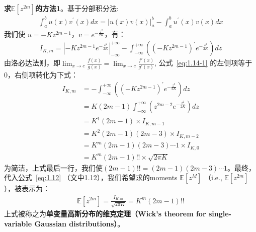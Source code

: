 \textbf{求$\mathbb{E}[z^{2m}]$的方法1}。基于分部积分法: %
\begin{equation}
    \begin{split}
 \label{eq:partial_int}
    \int_{a}^{b}{u(x)v^{'}(x)dx} =  {\left | u(x)v(x) \right |}_{a}^{b} - \int_{a}^{b}{u^{'}(x)v(x)dx} 
    \end{split}
\end{equation}
我们使 $u=-K z^{2m-1}$，$v=e^{-\frac{z^2}{2K}}$，有：
\begin{equation}
    \begin{split}
\label{eq:1.14-1}
    I_{K,m} 
        = {\left | -K z^{2m-1} e^{-\frac{z^2}{2K}} \right |}_{-\infty}^{+\infty} - \int_{-\infty}^{+\infty}\left(
            (-K z^{2m-1})^{'} e^{-\frac{z^2}{2K}}
        \right) dz 
    \end{split}
\end{equation}
由洛必达法则，即$\lim_{x\rightarrow c}\frac{f(x)}{g(x)} = \lim_{x\rightarrow c}\frac{f'(x)}{g'(x)}$, %
公式~\eqref{eq:1.14-1} 的左侧项等于 $0$，右侧项转化为下式：
\begin{equation}
    \begin{split}
        I_{K,m} 
            &= - \int_{-\infty}^{+\infty}\left(
                (-K z^{2m-1})^{'} e^{-\frac{z^2}{2K}}
            \right) dz \\
            &= K(2m-1) \int_{-\infty}^{+\infty}\left(
                z^{2m-2} e^{-\frac{z^2}{2K}}
            \right) dz \\
            &= K^1(2m-1) \times I_{K,m-1} \\
            &= K^2 (2m-1)(2m-3) \times I_{K,m-2} \\
            &= K^m (2m-1)(2m-3)\cdots 1 \times I_{K,0} \\
            &= K^m (2m-1)!! \times \sqrt{2\pi K} 
    \end{split}
\end{equation}
为简洁，上式最后一行，我们使$(2m-1)!!=(2m-1)(2m-3)\cdots 1$。最终，代入公式~\eqref{eq:1.12} （文中1.12），我们希望求的moments $\mathbb{E}[z^{M}]$ （i.e., $\mathbb{E}[z^{2m}]$），被表示为：
\begin{equation}
    \begin{split}
    \mathbb{E}[z^{2m}] 
        =\frac{I_{K,m}}{\sqrt{2\pi K}} 
        = K^m (2m-1)!!
    \end{split}
\end{equation}
上式被称之为\textbf{单变量高斯分布的维克定理（Wick's theorem for single-variable Gaussian distributions）}。


